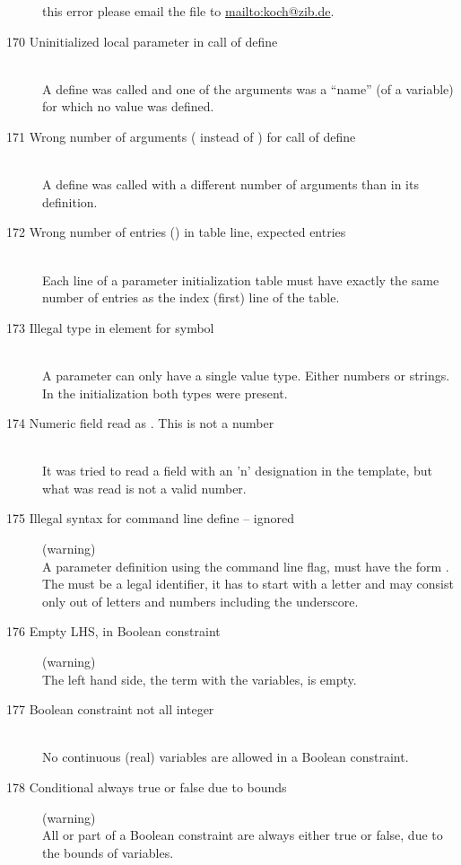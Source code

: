 \begin{description}
  this error please email the  file to \url{mailto:koch@zib.de}.
%
%
\item[170 Uninitialized local parameter \code{xxx} in call of
  define \code{yyy}]\ \\
  A define was called and one of the arguments was a ``name'' 
  (of a variable) for which no value was defined.
\item[171 Wrong number of arguments (\code{xxx} instead of \code{yyy})
  for call of define \code{zzz}]\ \\
  A define was called with a different number of arguments than in
  its definition.
\item[172 Wrong number of entries (\code{xxx}) in table line, 
  expected \code{yyy} entries]\ \\
  Each line of a parameter initialization table must have
  exactly the same number of entries as the index (first) line of
  the table.
\item[173 Illegal type in element \code{xxx} for symbol]\ \\
  A parameter can only have a single value type. Either numbers or
  strings. In the initialization both types were present.
%
%
\item[174 Numeric field \code{xxx} read as \code{"yyy"}. This is not a
  number]\ \\
  It was tried to read a field with an 'n' designation in the template,
  but what was read is not a valid number.
%
%
\item[175 Illegal syntax for command line define \code{"xxx"} --
  ignored] (warning)\\
  A parameter definition using the command line  flag, must
  have the form . The  must be a legal
  identifier, \ie it has to start with a letter and may consist only out
  of letters and numbers including the underscore. 
%
%
\item[176 Empty LHS, in Boolean constraint] (warning)\ \\
   The left hand side, \ie the term with the variables, is empty. 
\item[177 Boolean constraint not all integer]\ \\
   No continuous (real) variables are allowed in a Boolean constraint.
\item[178 Conditional always true or false due to bounds] (warning)\ \\
   All or part of a Boolean constraint are always either true or
   false, due to the bounds of variables.

\end{description}
